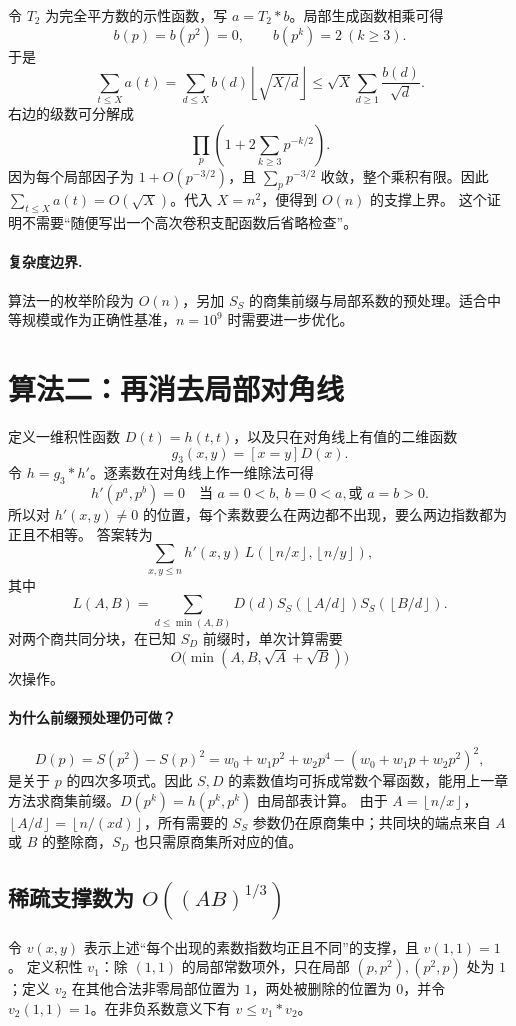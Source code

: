 \documentclass[UTF8,a4paper,11pt,oneside,openany,fontset=fandol]{ctexbook}
\theoremstyle{definition}
\newcommand{\floor}[1]{\left\lfloor #1\right\rfloor}
\begin{document}
令 $T_2$ 为完全平方数的示性函数，写 $a=T_2*b$。局部生成函数相乘可得
\[
 b(p)=b(p^2)=0,\qquad b(p^k)=2\ (k\ge3).
\]
于是
\[
\sum_{t\le X}a(t)=\sum_{d\le X}b(d)\floor{\sqrt{X/d}}
\le\sqrt X\sum_{d\ge1}\frac{b(d)}{\sqrt d}.
\]
右边的级数可分解成
\[
 \prod_p\left(1+2\sum_{k\ge3}p^{-k/2}\right).
\]
因为每个局部因子为 $1+O(p^{-3/2})$，且 $\sum_p p^{-3/2}$ 收敛，整个乘积有限。因此 $\sum_{t\le X}a(t)=O(\sqrt X)$。代入 $X=n^2$，便得到 $O(n)$ 的支撑上界。
这个证明不需要“随便写出一个高次卷积支配函数后省略检查”。

\paragraph{复杂度边界.} 算法一的枚举阶段为 $O(n)$，另加 $S_S$ 的商集前缀与局部系数的预处理。适合中等规模或作为正确性基准，$n=10^9$ 时需要进一步优化。


\section{算法二：再消去局部对角线}
定义一维积性函数 $D(t)=h(t,t)$，以及只在对角线上有值的二维函数
\[
 g_3(x,y)=[x=y]D(x).
\]
令 $h=g_3*h'$。逐素数在对角线上作一维除法可得
\[
 h'(p^a,p^b)=0\quad\text{当 }a=0<b,\ b=0<a,\text{或 }a=b>0.
\]
所以对 $h'(x,y)\ne0$ 的位置，每个素数要么在两边都不出现，要么两边指数都为正且不相等。
答案转为
\[
 \sum_{x,y\le n}h'(x,y)\,L(\floor{n/x},\floor{n/y}),
\]
其中
\[
 L(A,B)=\sum_{d\le\min(A,B)}D(d)
 S_S(\floor{A/d})S_S(\floor{B/d}).
\]
对两个商共同分块，在已知 $S_D$ 前缀时，单次计算需要
\[
 O\bigl(\min(A,B,\sqrt A+\sqrt B)\bigr)
\]
次操作。


\paragraph{为什么前缀预处理仍可做？}
\[
 D(p)=S(p^2)-S(p)^2
 =w_0+w_1p^2+w_2p^4-(w_0+w_1p+w_2p^2)^2,
\]
是关于 $p$ 的四次多项式。因此 $S,D$ 的素数值均可拆成常数个幂函数，能用上一章方法求商集前缀。$D(p^k)=h(p^k,p^k)$ 由局部表计算。
由于 $A=\floor{n/x}$，$\floor{A/d}=\floor{n/(xd)}$，所有需要的 $S_S$ 参数仍在原商集中；共同块的端点来自 $A$ 或 $B$ 的整除商，$S_D$ 也只需原商集所对应的值。

\subsection{稀疏支撑数为 \texorpdfstring{$O((AB)^{1/3})$}{O((AB)1/3)}}
令 $v(x,y)$ 表示上述“每个出现的素数指数均正且不同”的支撑，且 $v(1,1)=1$。
定义积性 $v_1$：除 $(1,1)$ 的局部常数项外，只在局部 $(p,p^2),(p^2,p)$ 处为 $1$；定义 $v_2$ 在其他合法非零局部位置为 $1$，两处被删除的位置为 $0$，并令 $v_2(1,1)=1$。在非负系数意义下有 $v\le v_1*v_2$。
\end{document}
